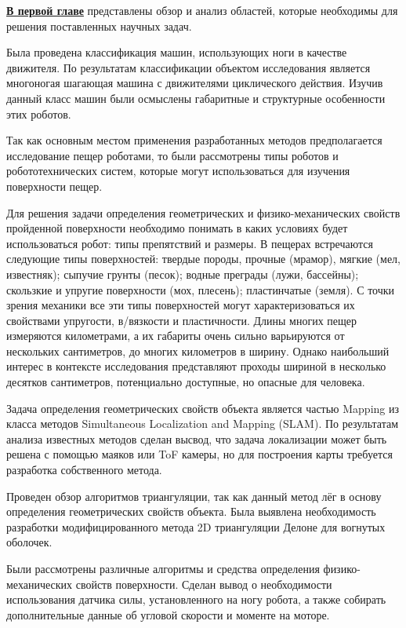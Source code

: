 
\textbf{\underline{В первой главе}} представлены обзор и анализ областей, которые необходимы для решения поставленных научных задач.

Была проведена классификация машин, использующих ноги в качестве движителя. По результатам классификации объектом исследования является многоногая шагающая машина с движителями циклического действия. Изучив данный класс машин были осмыслены габаритные и структурные особенности этих роботов.

Так как основным местом применения разработанных методов предполагается исследование пещер роботами, то были рассмотрены типы роботов и робототехнических систем, которые могут использоваться для изучения поверхности пещер.

Для решения задачи определения геометрических и физико-механических свойств пройденной поверхности необходимо понимать в каких условиях будет использоваться робот: типы препятствий и размеры. В пещерах встречаются следующие типы поверхностей: твердые породы, прочные (мрамор), мягкие (мел, известняк); сыпучие грунты (песок); водные преграды (лужи, бассейны); скользкие и упругие поверхности (мох, плесень); пластинчатые (земля). С точки зрения механики все эти типы поверхностей могут характеризоваться их свойствами упругости, в/вязкости и пластичности. Длины многих пещер измеряются километрами, а их габариты очень сильно варьируются от нескольких сантиметров, до многих километров в ширину. Однако наибольший интерес в контексте исследования представляют проходы шириной в несколько десятков сантиметров, потенциально доступные, но опасные для человека.

Задача определения геометрических свойств объекта является частью Mapping из  класса методов Simultaneous Localization and Mapping (SLAM). По результатам анализа известных методов сделан высвод, что задача локализации может быть решена с помощью маяков или ToF камеры, но для построения карты требуется разработка собственного метода.

Проведен обзор алгоритмов триангуляции, так как данный метод лёг в основу определения геометрических свойств объекта. Была выявлена необходимость разработки модифицированного метода 2D триангуляции Делоне для вогнутых оболочек.

Были рассмотрены различные алгоритмы и средства определения физико-механических свойств поверхности. Сделан вывод о необходимости использования датчика силы, установленного на ногу робота, а также собирать дополнительные данные об угловой скорости и моменте на моторе.

